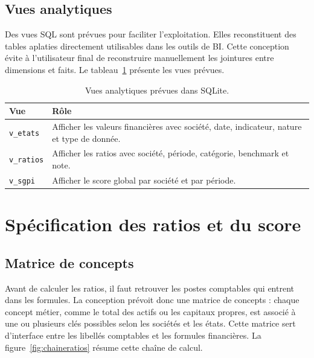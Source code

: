 \subsection{Vues analytiques}
\par Des vues SQL sont prévues pour faciliter l'exploitation. Elles
reconstituent des tables aplaties directement utilisables dans les outils de BI.
Cette conception évite à l'utilisateur final de reconstruire manuellement les
jointures entre dimensions et faits. Le tableau~\ref{tab:vues} présente les vues
prévues.

\begin{table}[H]
\centering
\caption[Vues analytiques]{Vues analytiques prévues dans SQLite.}
\label{tab:vues}
\begin{tabularx}{\linewidth}{|p{3cm}|X|}
\hline
\textbf{Vue} & \textbf{Rôle} \\ \hline
\texttt{v\_etats} & Afficher les valeurs financières avec société, date, indicateur, nature et type de donnée. \\ \hline
\texttt{v\_ratios} & Afficher les ratios avec société, période, catégorie, benchmark et note. \\ \hline
\texttt{v\_sgpi} & Afficher le score global par société et par période. \\ \hline
\end{tabularx}
\end{table}

\section{Spécification des ratios et du score}
\label{sec:specratios}
\subsection{Matrice de concepts}
\par Avant de calculer les ratios, il faut retrouver les postes comptables qui
entrent dans les formules. La conception prévoit donc une matrice de concepts :
chaque concept métier, comme le total des actifs ou les capitaux propres, est
associé à une ou plusieurs clés possibles selon les sociétés et les états. Cette
matrice sert d'interface entre les libellés comptables et les formules
financières. La figure~\ref{fig:chaineratios} résume cette chaîne de calcul.

